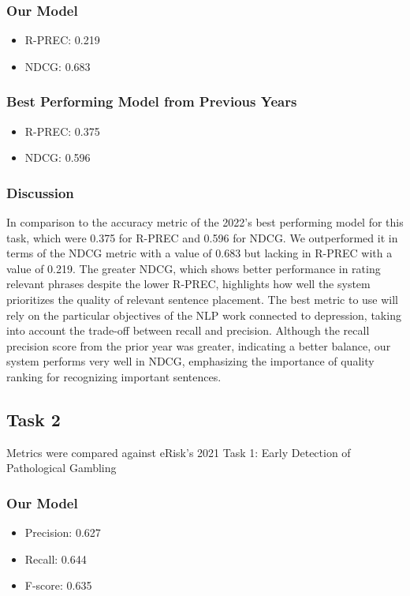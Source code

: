 \documentclass[12pt, titlepage]{article}
\begin{document}
\begin{enumerate}
\subsubsection{Our Model}
\begin{itemize}
\item R-PREC: 0.219
\item NDCG: 0.683
\end{itemize}


\subsubsection{Best Performing Model from Previous Years}
\begin{itemize}
\item R-PREC: 0.375
\item NDCG: 0.596
\end{itemize}


\subsubsection{Discussion}
In comparison to the accuracy metric of the 2022's best performing model for this task, which were 0.375 for R-PREC and 0.596 for NDCG. We outperformed it in terms of the NDCG metric with a value of 0.683 but lacking in R-PREC with a value of 0.219. The greater NDCG, which shows better performance in rating relevant phrases despite the lower R-PREC, highlights how well the system prioritizes the quality of relevant sentence placement. The best metric to use will rely on the particular objectives of the NLP work connected to depression, taking into account the trade-off between recall and precision. Although the recall precision score from the prior year was greater, indicating a better balance, our system performs very well in NDCG, emphasizing the importance of quality ranking for recognizing important sentences.




\subsection{Task 2}
Metrics were compared against eRisk's 2021 Task 1: Early Detection of Pathological Gambling


\subsubsection{Our Model}
\begin{itemize}
   \item Precision: 0.627
   \item Recall: 0.644
   \item F-score: 0.635
\end{itemize}



\end{enumerate}
\end{document}
